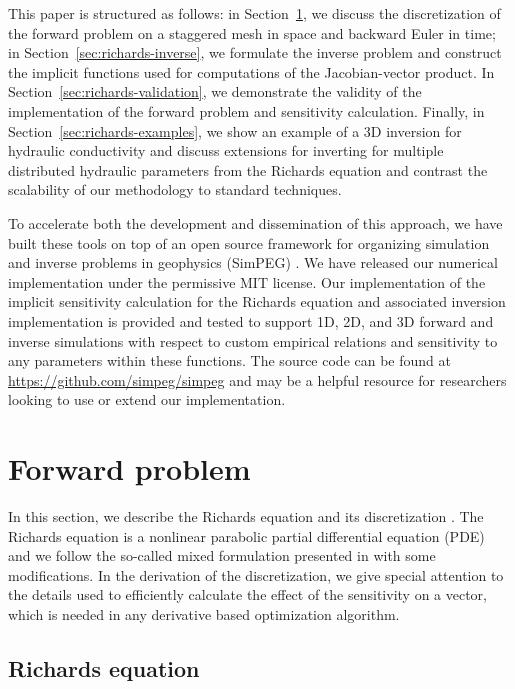 \documentclass[preprint,review,3p,times,onecolumn,authoryear]{elsarticle}
\begin{document}
This paper is structured as follows: in Section~\ref{sec:richards-forward}, we discuss the discretization of the forward problem on a staggered mesh in space and backward Euler in time; in Section~\ref{sec:richards-inverse}, we formulate the inverse problem and construct the implicit functions used for computations of the Jacobian-vector product. In Section~\ref{sec:richards-validation}, we demonstrate the validity of the implementation of the forward problem and sensitivity calculation. Finally, in Section~\ref{sec:richards-examples}, we show an example of a 3D inversion for hydraulic conductivity and discuss extensions for inverting for multiple distributed hydraulic parameters from the Richards equation and contrast the scalability of our methodology to standard techniques.

To accelerate both the development and dissemination of this approach, we have built these tools on top of an open source framework for organizing simulation and inverse problems in geophysics (SimPEG) \citep{simpeg2015}. We have released our numerical implementation under the permissive MIT license. Our implementation of the implicit sensitivity calculation for the Richards equation and associated inversion implementation is provided and tested to support 1D, 2D, and 3D forward and inverse simulations with respect to custom empirical relations and sensitivity to any parameters within these functions. The source code can be found at \url{https://github.com/simpeg/simpeg} and may be a helpful resource for researchers looking to use or extend our implementation.

\section{Forward problem}
\label{sec:richards-forward}

In this section, we describe the Richards equation and its discretization \citep{Richards1931}. The Richards equation is a nonlinear parabolic partial differential equation (PDE) and we follow the so-called mixed formulation presented in \cite{Celia1990} with some modifications. In the derivation of the discretization, we give special attention to the details used to efficiently calculate the effect of the sensitivity on a vector, which is needed in any derivative based optimization algorithm.
\subsection{Richards equation}
\end{document}
